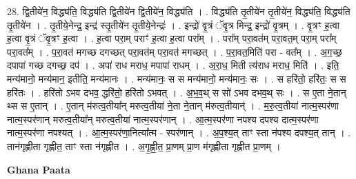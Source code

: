 \documentclass[17pt]{extarticle}
\begin{document}
28. द्वि॒तीये॑न॒ विद्ध्य॑ति॒ विद्ध्य॑ति द्वि॒तीये॑न द्वि॒तीये॑न॒ विद्ध्य॑ति । . विद्ध्य॑ति तृ॒तीये॑न तृ॒तीये॑न॒ विद्ध्य॑ति॒ विद्ध्य॑ति तृ॒तीये॑न । . तृ॒तीये॒नेन्द्र॒ इन्द्र॑ स्तृ॒तीये॑न तृ॒तीये॒नेन्द्रः॑ । . इन्द्रो॑ वृ॒त्रं ॅवृ॒त्र मिन्द्र॒ इन्द्रो॑ वृ॒त्रम् । . वृ॒त्रꣳ ह॒त्वा ह॒त्वा वृ॒त्रं ॅवृ॒त्रꣳ ह॒त्वा । . ह॒त्वा परा॒म् पराꣳ॑ ह॒त्वा ह॒त्वा परा᳚म् । . परा᳚म् परा॒वत॑म् परा॒वत॒म् परा॒म् परा᳚म् परा॒वत᳚म् । . प॒रा॒वत॑ मगच्छ दगच्छत् परा॒वत॑म् परा॒वत॑ मगच्छत् । . प॒रा॒वत॒मिति॑ परा - वत᳚म् । . अ॒ग॒च्छ॒ दपापा॑ गच्छ दगच्छ॒ दप॑ । . अपा॑ राध मराध॒ मपापा॑ राधम् । . अ॒रा॒ध॒ मिती त्य॑राध मराध॒ मिति॑ । . इति॒ मन्य॑मानो॒ मन्य॑मान॒ इतीति॒ मन्य॑मानः । . मन्य॑मानः॒ स स मन्य॑मानो॒ मन्य॑मानः॒ सः । . स हरि॑तो॒ हरि॑तः॒ स स हरि॑तः । . हरि॑तो ऽभव दभव॒ द्धरि॑तो॒ हरि॑तो ऽभवत् । . अ॒भ॒व॒थ् स सो॑ ऽभव दभव॒थ् सः । . स ए॒ता ने॒तान् थ्स स ए॒तान् । . ए॒तान् म॑रुत्व॒तीया᳚न् मरुत्व॒तीया॑ ने॒ता ने॒तान् म॑रुत्व॒तीयान्॑ । . म॒रु॒त्व॒तीया॑ नात्म॒स्पर॑णा नात्म॒स्पर॑णान् मरुत्व॒तीया᳚न् मरुत्व॒तीया॑ नात्म॒स्पर॑णान् । . आ॒त्म॒स्पर॑णा नपश्य दपश्य दात्म॒स्पर॑णा नात्म॒स्पर॑णा नपश्यत् । . आ॒त्म॒स्पर॑णा॒नित्या᳚त्म - स्पर॑णान् । . अ॒प॒श्य॒त् ताꣳ स्ता न॑पश्य दपश्य॒त् तान् । . तान॑गृह्णीता गृह्णीत॒ ताꣳ स्ता न॑गृह्णीत । . अ॒गृ॒ह्णी॒त॒ प्रा॒णम् प्रा॒ण म॑गृह्णीता गृह्णीत प्रा॒णम् । \newline

\textbf{Ghana Paata } \newline
\end{document}

